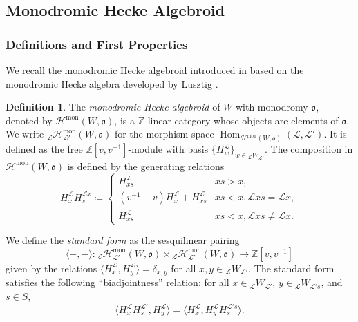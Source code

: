 \documentclass{amsart}
\newcommand{\Z}{\mathbb{Z}}
\newcommand{\scrH}{\mathcal{H}}
\newcommand{\scrL}{\mathcal{L}}
\DeclareMathOperator{\Hom}{Hom}
\newcommand{\fr}[1]{\mathfrak{#1}}
\DeclareMathOperator{\mon}{mon}
\newcommand{\W}[2]{{}_{#1}W_{#2}}
\theoremstyle{definition}
\newtheorem{definition}[subsubsection]{Definition}
\numberwithin{equation}{subsection}
\begin{document}
\subsection{Monodromic Hecke Algebroid}\label{subsec:mha}

\subsubsection{Definitions and First Properties}

We recall the monodromic Hecke algebroid introduced in \cite{Sandvik} based on the monodromic Hecke algebra developed by Lusztig \cite{Lus16, Lus19}.

\begin{definition}
    The \emph{monodromic Hecke algebroid} of $W$ with monodromy $\fr{o}$, denoted by $\scrH^{\mon} (W, \fr{o})$, is a $\Z$-linear category whose objects are elements of $\fr{o}$.
    We write ${}_{\scrL} \scrH^{\mon}_{\scrL'} (W, \fr{o})$ for the morphism space $\Hom_{\scrH^{\mon} (W, \fr{o})} (\scrL, \scrL')$. It is defined as the free $\Z [v,v^{-1}]$-module with basis $\{ H_w^{\scrL} \}_{w \in \W{\scrL}{\scrL'}}$.
    The composition in $\scrH^{\mon} (W, \fr{o})$ is defined by the generating relations
    \begin{equation}
      H_x^{\scrL} H_s^{\scrL x} \coloneq \begin{cases} H_{xs}^{\scrL} & xs > x, \\ (v^{-1} - v)H_{x}^{\scrL} + H_{xs}^{\scrL}  & xs < x, \scrL xs = \scrL x, \\ H_{xs}^{\scrL} & xs < x, \scrL xs \neq \scrL x.\end{cases}
    \end{equation}
\end{definition}

We define the \emph{standard form} as the sesquilinear pairing
\[\langle -, - \rangle : {}_{\scrL} \scrH^{\mon}_{\scrL'} (W, \fr{o}) \times {}_{\scrL} \scrH^{\mon}_{\scrL'} (W, \fr{o}) \to \Z [v,v^{-1}]\]
given by the relations $\langle H_x^{\scrL}, H_y^{\scrL} \rangle = \delta_{x,y}$ for all $x,y \in \W{\scrL}{\scrL'}$.
The standard form satisfies the following ``biadjointness'' relation: for all $x\in \W{\scrL}{\scrL'}$, $y \in \W{\scrL}{\scrL' s}$, and $s \in S$,
\begin{equation}\label{eq:mha_biadjoint}
    \langle H_x^{\scrL} H_s^{\scrL'}, H_y^{\scrL} \rangle = \langle H_x^{\scrL}, H_y^{\scrL} H_s^{\scrL' s} \rangle.
\end{equation} 
\end{document}
